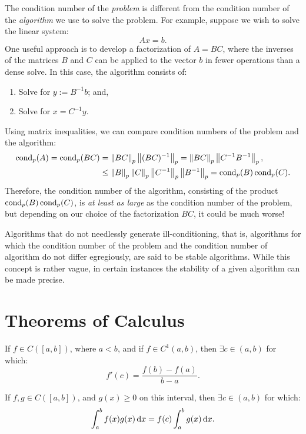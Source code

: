 \begin{remark}\label{remark:ConditionNumberFactorization}
The condition number of the {\em problem} is different from the condition number of the {\em algorithm} we use to solve the problem. For example, suppose we wish to solve the linear system:
\[
Ax = b.
\]
One useful approach is to develop a factorization of $A = BC$, where the inverses of the matrices $B$ and $C$ can be applied to the vector $b$ in fewer operations than a dense solve. In this case, the algorithm consists of:
\begin{enumerate}
\item Solve for $y := B^{-1}b$; and,
\item Solve for $x = C^{-1}y$.
\end{enumerate}
Using matrix inequalities, we can compare condition numbers of the problem and the algorithm:
\begin{align*}
\operatorname{cond}_p(A) = \operatorname{cond}_p(BC) & = \left\|{BC}\right\|_p\left\|{(BC)^{-1}}\right\|_p = \left\|{BC}\right\|_p\left\|{C^{-1}B^{-1}}\right\|_p,\\
& \le \left\|{B}\right\|_p\left\|{C}\right\|_p\left\|{C^{-1}}\right\|_p\left\|{B^{-1}}\right\|_p = \operatorname{cond}_p(B)\operatorname{cond}_p(C).
\end{align*}
Therefore, the condition number of the algorithm, consisting of the product $\operatorname{cond}_p(B)\operatorname{cond}_p(C)$, is {\em at least as large} as the condition number of the problem, but depending on our choice of the factorization $BC$, it could be much worse!
\end{remark}

Algorithms that do not needlessly generate ill-conditioning, that is, algorithms for which the condition number of the problem and the condition number of algorithm do not differ egregiously, are said to be stable algorithms. While this concept is rather vague, in certain instances the stability of a given algorithm can be made precise.

\section{Theorems of Calculus}

\begin{theorem}
If $f\in C([a,b])$, where $a<b$, and if $f\in C^1(a,b)$, then $\exists c\in(a,b)$ for which:
\[
f'(c) = \dfrac{f(b)-f(a)}{b-a}.
\]
\end{theorem}

\begin{theorem}
If $f,g\in C([a,b])$, and $g(x)\ge0$ on this interval, then $\exists c\in(a,b)$ for which:
\[
\int_a^bf(x)g(x){\rm\,d} x = f(c)\int_a^bg(x){\rm\,d} x.
\]
\end{theorem}

